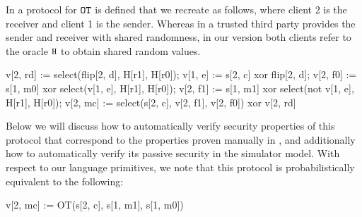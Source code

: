 \begin{example}
  \label{example-OT}
  In \cite{XXX} a protocol for $\texttt{OT}$ is defined that we recreate as
  follows, where client 2 is the receiver and client 1 is the sender. Whereas
  in \cite{XXX} a trusted third party provides the sender and receiver with
  shared randomness, in our version both clients refer to the oracle $\texttt{H}$
  to obtain shared random values. 
\begin{verbatimtab}
  v[2, rd] := select(flip[2, d], H[r1], H[r0]);
  v[1, e] := s[2, c] xor flip[2, d];
  v[2, f0] := s[1, m0] xor select(v[1, e], H[r1], H[r0]);
  v[2, f1] := s[1, m1] xor select(not v[1, e], H[r1], H[r0]);
  v[2, mc] := select(s[2, c], v[2, f1], v[2, f0]) xor v[2, rd]
\end{verbatimtab}
Below we will discuss how to automatically verify security properties
of this protocol that correspond to the properties proven manually in
\cite{XXX}, and additionally how to automatically verify its passive
security in the simulator model. With respect to our language primitives,
we note that this protocol is probabilistically equivalent to the
following:
\begin{verbatimtab}  
  v[2, mc] := OT(s[2, c], s[1, m1], s[1, m0])
\end{verbatimtab}
\end{example}

